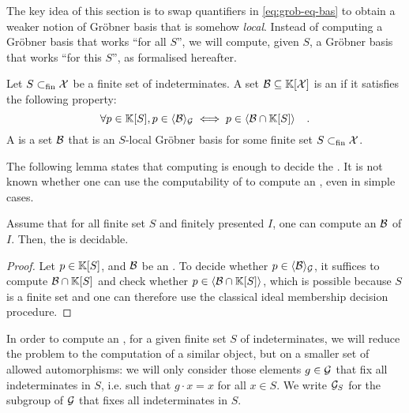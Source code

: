 The key idea of this section is to swap quantifiers in \cref{eq:grob-eq-bas}
to obtain a weaker notion of Gröbner basis that is somehow
\emph{local}.  Instead of computing a Gröbner basis that works
``for all $S$'', we will compute, given $S$, a
Gröbner basis that works ``for this $S$'', as formalised hereafter.
\begin{definition}
    \label{def:weak-grob}
    Let $S \subset_{\text{fin}} \mathcal{X}$ be a finite set of indeterminates.
    A set $\Basis \subseteq \poly{\K}{\X}$ is an 
    if it satisfies the following property:
    \begin{equation}
        \label{eq:weak-grob}
        \forall p \in \poly{\K}{S},
        p \in \gen{\Basis}{\group}
        \iff
        p \in \gen{\Basis \cap \poly{\K}{S}}
        \quad .
    \end{equation}
    A  
    is a set $\Basis$ that is an $S$-local Gröbner basis
    for some finite set $S \subset_{\text{fin}} \mathcal{X}$.
\end{definition}

The following lemma states that computing  is enough to
decide the . It is not known whether
one can use the computability of  to compute an
, even in simple cases.

\begin{lemma}
    Assume that for all finite set $S$ and 
    finitely presented  $I$,
    one can compute an 
     $\Basis$ of $I$.
    Then, the
    is decidable.
\end{lemma}
\begin{proof}
    Let $p \in \mathbb{K}[S]$, 
    and $\Basis$ be an .
    To decide whether $p \in \gen{\Basis}{\group}$,
    it suffices to compute $\Basis \cap \poly{\K}{S}$
    and check whether 
    $p \in \gen{\Basis \cap \poly{\K}{S}}{}$, which is possible
    because $S$ is a finite set and one can therefore use 
    the classical ideal membership decision procedure.
\end{proof}

In order to compute an , for a given finite set $S$
of indeterminates, we will reduce the problem to the computation of a similar
object, but on a smaller set of allowed automorphisms: we will only consider
those elements $g \in \mathcal{G}$ that fix all indeterminates in $S$, i.e. such
that $g \cdot x = x$ for all $x \in S$. We write $\mathcal{G}_S$ for the subgroup of
$\mathcal{G}$ that fixes all indeterminates in $S$.

